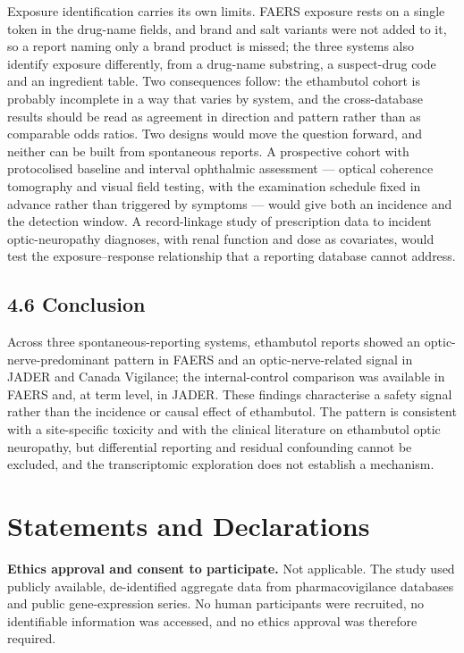 \documentclass[12pt,a4paper]{article}
\begin{document}
Exposure identification carries its own limits. FAERS exposure rests on a single token in the drug-name fields, and brand and salt variants were not added to it, so a report naming only a brand product is missed; the three systems also identify exposure differently, from a drug-name substring, a suspect-drug code and an ingredient table. Two consequences follow: the ethambutol cohort is probably incomplete in a way that varies by system, and the cross-database results should be read as agreement in direction and pattern rather than as comparable odds ratios. Two designs would move the question forward, and neither can be built from spontaneous reports. A prospective cohort with protocolised baseline and interval ophthalmic assessment — optical coherence tomography and visual field testing, with the examination schedule fixed in advance rather than triggered by symptoms — would give both an incidence and the detection window. A record-linkage study of prescription data to incident optic-neuropathy diagnoses, with renal function and dose as covariates, would test the exposure–response relationship that a reporting database cannot address.

\subsection*{4.6 Conclusion}

Across three spontaneous-reporting systems, ethambutol reports showed an optic-nerve-predominant pattern in FAERS and an optic-nerve-related signal in JADER and Canada Vigilance; the internal-control comparison was available in FAERS and, at term level, in JADER. These findings characterise a safety signal rather than the incidence or causal effect of ethambutol. The pattern is consistent with a site-specific toxicity and with the clinical literature on ethambutol optic neuropathy, but differential reporting and residual confounding cannot be excluded, and the transcriptomic exploration does not establish a mechanism.

\section*{Statements and Declarations}

\textbf{Ethics approval and consent to participate.} Not applicable. The study used publicly available, de-identified aggregate data from pharmacovigilance databases and public gene-expression series. No human participants were recruited, no identifiable information was accessed, and no ethics approval was therefore required.
\end{document}
